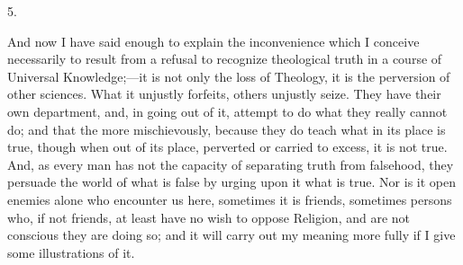 5.

And now I have said enough to explain the inconvenience which I
conceive necessarily to result from a refusal to recognize theological
truth in a course of Universal Knowledge;—it is not only the loss of
Theology, it is the perversion of other sciences. What it unjustly
forfeits, others unjustly seize. They have their own department, and,
in going out of it, attempt to do what they really cannot do; and that
the more mischievously, because they do teach what in its place is
true, though when out of its place, perverted or carried to excess, it
is not true. And, as every man has not the capacity of separating
truth from falsehood, they persuade the world of what is false by
urging upon it what is true. Nor is it open enemies alone who
encounter us here, sometimes it is friends, sometimes persons who, if
not friends, at least have no wish to oppose Religion, and are not
conscious they are doing so; and it will carry out my meaning more
fully if I give some illustrations of it.

